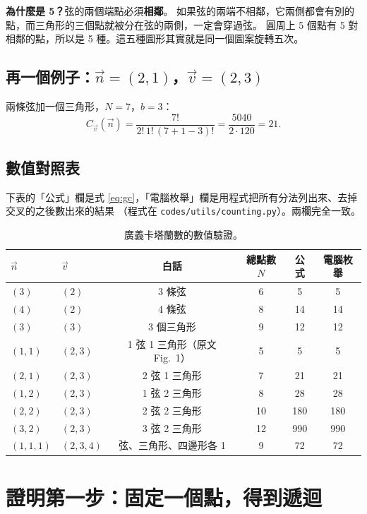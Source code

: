\documentclass[11pt,a4paper]{article}
\newcommand{\vn}{\vec n}
\newcommand{\vv}{\vec v}
\newcommand{\Cv}{C_{\vv}}
\begin{document}
\textbf{為什麼是 5？}弦的兩個端點必須\textbf{相鄰}。
如果弦的兩端不相鄰，它兩側都會有別的點，而三角形的三個點就被分在弦的兩側，一定會穿過弦。
圓周上 5 個點有 5 對相鄰的點，所以是 5 種。這五種圖形其實就是同一個圖案旋轉五次。

\subsection{再一個例子：$\vn=(2,1)$，$\vv=(2,3)$}

兩條弦加一個三角形，$N=7$，$b=3$：
\[
\Cv(\vn)=\frac{7!}{2!\,1!\,(7+1-3)!}=\frac{5040}{2\cdot 120}=21 .
\]

\subsection{數值對照表}

下表的「公式」欄是式 \eqref{eq:gc}，「電腦枚舉」欄是用程式把所有分法列出來、去掉交叉的之後數出來的結果
（程式在 \texttt{codes/utils/counting.py}）。兩欄完全一致。

\begin{table}[H]
\centering
\begin{tabular}{llcccc}
\toprule
$\vn$ & $\vv$ & 白話 & 總點數 $N$ & 公式 & 電腦枚舉\\
\midrule
$(3)$ & $(2)$ & 3 條弦 & 6 & 5 & 5\\
$(4)$ & $(2)$ & 4 條弦 & 8 & 14 & 14\\
$(3)$ & $(3)$ & 3 個三角形 & 9 & 12 & 12\\
$(1,1)$ & $(2,3)$ & 1 弦 1 三角形（原文 Fig.~1） & 5 & 5 & 5\\
$(2,1)$ & $(2,3)$ & 2 弦 1 三角形 & 7 & 21 & 21\\
$(1,2)$ & $(2,3)$ & 1 弦 2 三角形 & 8 & 28 & 28\\
$(2,2)$ & $(2,3)$ & 2 弦 2 三角形 & 10 & 180 & 180\\
$(3,2)$ & $(2,3)$ & 3 弦 2 三角形 & 12 & 990 & 990\\
$(1,1,1)$ & $(2,3,4)$ & 弦、三角形、四邊形各 1 & 9 & 72 & 72\\
\bottomrule
\end{tabular}
\caption{廣義卡塔蘭數的數值驗證。}
\end{table}

\section{證明第一步：固定一個點，得到遞迴}
\end{document}
